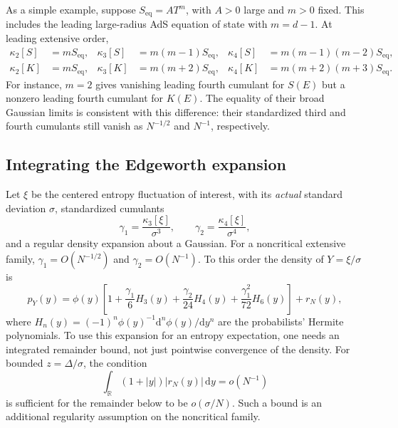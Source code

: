 \documentclass[11pt,letterpaper]{article}
\newcommand{\dd}{\mathrm{d}}
\theoremstyle{plain}
\theoremstyle{definition}
\theoremstyle{remark}
\begin{document}
As a simple example, suppose $S_{\mathrm{eq}}=A T^m$, with $A>0$ large and $m>0$ fixed. This includes the leading large-radius AdS equation of state with $m=d-1$. At leading extensive order,
\begin{equation}
 \begin{aligned}
 \kappa_2[S]&=mS_{\mathrm{eq}},&
 \kappa_3[S]&=m(m-1)S_{\mathrm{eq}},&
 \kappa_4[S]&=m(m-1)(m-2)S_{\mathrm{eq}},\\
 \kappa_2[K]&=mS_{\mathrm{eq}},&
 \kappa_3[K]&=m(m+2)S_{\mathrm{eq}},&
 \kappa_4[K]&=m(m+2)(m+3)S_{\mathrm{eq}}.
 \end{aligned}
 \label{eq06:power_law_cumulants}
\end{equation}
For instance, $m=2$ gives vanishing leading fourth cumulant for $S(E)$ but a nonzero leading fourth cumulant for $K(E)$. The equality of their broad Gaussian limits is consistent with this difference: their standardized third and fourth cumulants still vanish as $N^{-1/2}$ and $N^{-1}$, respectively.

\subsection{Integrating the Edgeworth expansion}

Let $\xi$ be the centered entropy fluctuation of interest, with its \emph{actual} standard deviation $\sigma$, standardized cumulants
\begin{equation}
 \gamma_1=\frac{\kappa_3[\xi]}{\sigma^3},\qquad
 \gamma_2=\frac{\kappa_4[\xi]}{\sigma^4},
 \label{eq06:standardized}
\end{equation}
and a regular density expansion about a Gaussian. For a noncritical extensive family, $\gamma_1=O(N^{-1/2})$ and $\gamma_2=O(N^{-1})$. To this order the density of $Y=\xi/\sigma$ is
\begin{equation}
 p_Y(y)=\phi(y)\left[
 1+\frac{\gamma_1}{6}H_3(y)
 +\frac{\gamma_2}{24}H_4(y)
 +\frac{\gamma_1^2}{72}H_6(y)\right]+r_N(y),
 \label{eq06:edgeworth_density}
\end{equation}
where $H_n(y)=(-1)^n\phi(y)^{-1}\dd^n\phi(y)/\dd y^n$ are the probabilists' Hermite polynomials. To use this expansion for an entropy expectation, one needs an integrated remainder bound, not just pointwise convergence of the density. For bounded $z=\Delta/\sigma$, the condition
\begin{equation}
 \int_{\mathbb R}(1+|y|)|r_N(y)|\,\dd y=o(N^{-1})
 \label{eq06:edgeworth_remainder}
\end{equation}
is sufficient for the remainder below to be $o(\sigma/N)$. Such a bound is an additional regularity assumption on the noncritical family.
\end{document}
